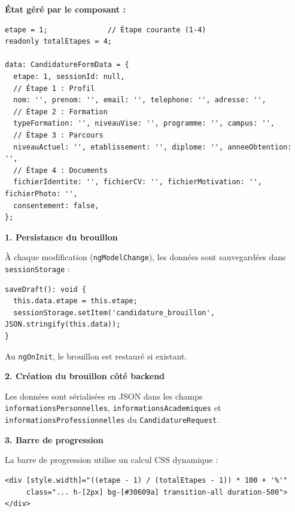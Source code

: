 \documentclass[a4paper,12pt,french]{article}
\begin{document}
\textbf{État géré par le composant :}
\begin{lstlisting}[style=tsstyle]
etape = 1;              // Étape courante (1-4)
readonly totalEtapes = 4;

data: CandidatureFormData = {
  etape: 1, sessionId: null,
  // Étape 1 : Profil
  nom: '', prenom: '', email: '', telephone: '', adresse: '',
  // Étape 2 : Formation
  typeFormation: '', niveauVise: '', programme: '', campus: '',
  // Étape 3 : Parcours
  niveauActuel: '', etablissement: '', diplome: '', anneeObtention: '',
  // Étape 4 : Documents
  fichierIdentite: '', fichierCV: '', fichierMotivation: '', fichierPhoto: '',
  consentement: false,
};
\end{lstlisting}

\begin{solutionbox}
\textbf{1. Persistance du brouillon}

À chaque modification (\texttt{ngModelChange}), les données sont sauvegardées dans \texttt{sessionStorage} :

\begin{lstlisting}[style=tsstyle]
saveDraft(): void {
  this.data.etape = this.etape;
  sessionStorage.setItem('candidature_brouillon', JSON.stringify(this.data));
}
\end{lstlisting}

Au \texttt{ngOnInit}, le brouillon est restauré si existant.

\textbf{2. Création du brouillon côté backend}

Les données sont sérialisées en JSON dans les champs \texttt{informationsPersonnelles}, \texttt{informationsAcademiques} et \texttt{informationsProfessionnelles} du \texttt{CandidatureRequest}.

\textbf{3. Barre de progression}

La barre de progression utilise un calcul CSS dynamique :

\begin{lstlisting}[style=htmlstyle]
<div [style.width]="((etape - 1) / (totalEtapes - 1)) * 100 + '%'"
     class="... h-[2px] bg-[#30609a] transition-all duration-500">
</div>
\end{lstlisting}
\end{solutionbox}
\end{document}
